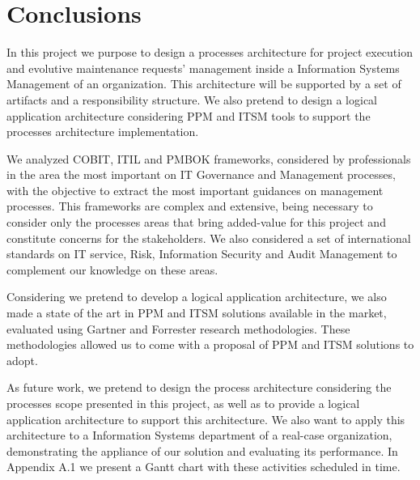 
% 
% 

\section{Conclusions}

In this project we purpose to design a processes architecture for project execution and evolutive maintenance requests' management inside a Information Systems Management of an organization. This architecture will be supported by a set of artifacts and a responsibility structure. We also pretend to design a logical application architecture considering PPM and ITSM tools to support the processes architecture implementation.\par
We analyzed COBIT, ITIL and PMBOK frameworks, considered by professionals in the area the most important on IT Governance and Management processes, with the objective to extract the most important guidances on management processes. This frameworks are complex and extensive, being necessary to consider only the processes areas that bring added-value for this project and constitute concerns for the stakeholders. We also considered a set of international standards on IT service, Risk, Information Security and Audit Management to complement our knowledge on these areas.\par
Considering we pretend to develop a logical application architecture, we also made a state of the art in PPM and ITSM solutions available in the market, evaluated using Gartner and Forrester research methodologies. These methodologies allowed us to come with a proposal of PPM and ITSM solutions to adopt.\par
As future work, we pretend to design the process architecture considering the processes scope presented in this project, as well as to provide a logical application architecture to support this architecture. We also want to apply this architecture to a Information Systems department of a real-case organization, demonstrating the appliance of our solution and evaluating its performance. In Appendix A.1 we present a Gantt chart with these activities scheduled in time.\par 
